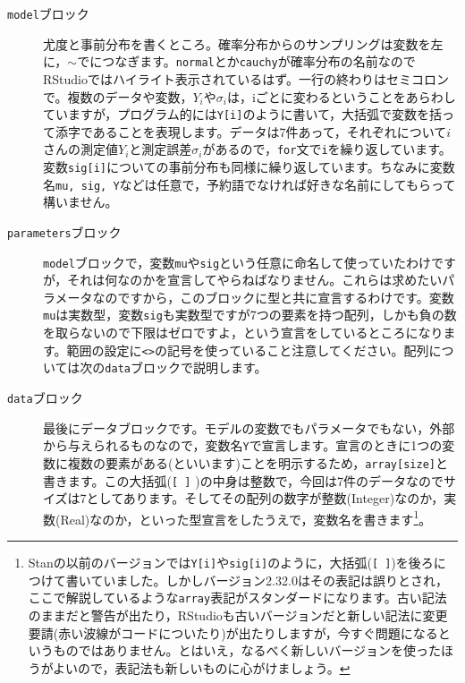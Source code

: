 \begin{description}
	\item[\texttt{model}ブロック] 尤度と事前分布を書くところ。確率分布からのサンプリングは変数を左に，$\sim$でにつなぎます。\texttt{normal}とか\texttt{cauchy}が確率分布の名前なのでRStudioではハイライト表示されているはず。一行の終わりはセミコロンで。複数のデータや変数，$Y_i$や$\sigma_i$は，iごとに変わるということをあらわしていますが，プログラム的には\verb|Y[i]|のように書いて，大括弧で変数を括って添字であることを表現します。データは7件あって，それぞれについて$i$さんの測定値$Y_i$と測定誤差$\sigma_i$があるので，\texttt{for}文で\verb|i|を繰り返しています。変数\verb|sig[i]|についての事前分布も同様に繰り返しています。ちなみに変数名\texttt{mu, sig, Y}などは任意で，予約語でなければ好きな名前にしてもらって構いません。
	\item[\texttt{parameters}ブロック] \texttt{model}ブロックで，変数\texttt{mu}や\texttt{sig}という任意に命名して使っていたわけですが，それは何なのかを宣言してやらねばなりません。これらは求めたいパラメータなのですから，このブロックに型と共に宣言するわけです。変数\verb|mu|は実数型，変数\verb|sig|も実数型ですが7つの要素を持つ配列，しかも負の数を取らないので下限はゼロですよ，という宣言をしているところになります。範囲の設定に\verb|<>|の記号を使っていること注意してください。配列については次の\texttt{data}ブロックで説明します。
	\item[\texttt{data}ブロック] 最後にデータブロックです。モデルの変数でもパラメータでもない，外部から与えられるものなので，変数名\verb|Y|で宣言します。宣言のときに1つの変数に複数の要素がある(といいます)ことを明示するため，\verb|array[size]|と書きます。この大括弧(\verb|[ ]| )の中身は整数で，今回は7件のデータなのでサイズは7としてあります。そしてその配列の数字が整数(Integer)なのか，実数(Real)なのか，といった型宣言をしたうえで，変数名を書きます\footnote{Stanの以前のバージョンでは\verb|Y[i]|や\verb|sig[i]|のように，大括弧(\verb|[ ]|)を後ろにつけて書いていました。しかしバージョン2.32.0はその表記は誤りとされ，ここで解説しているような\verb|array|表記がスタンダードになります。古い記法のままだと警告が出たり，RStudioも古いバージョンだと新しい記法に変更要請(赤い波線がコードについたり)が出たりしますが，今すぐ問題になるというものではありません。とはいえ，なるべく新しいバージョンを使ったほうがよいので，表記法も新しいものに心がけましょう。}。
\end{description}
